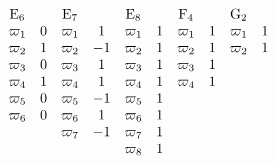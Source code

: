 \[
\begin{array}{c c c c c c c c c c} \mathrm{E} _ {6} & & \mathrm{E} _ {7} & & \mathrm{E} _ {8} & & \mathrm{F} _ {4} & & \mathrm{G} _ {2} \\ \varpi_ {1} & 0 & \varpi_ {1} & 1 & \varpi_ {1} & 1 & \varpi_ {1} & 1 & \varpi_ {1} & 1 \\ \varpi_ {2} & 1 & \varpi_ {2} & - 1 & \varpi_ {2} & 1 & \varpi_ {2} & 1 & \varpi_ {2} & 1 \\ \varpi_ {3} & 0 & \varpi_ {3} & 1 & \varpi_ {3} & 1 & \varpi_ {3} & 1 \\ \varpi_ {4} & 1 & \varpi_ {4} & 1 & \varpi_ {4} & 1 & \varpi_ {4} & 1 \\ \varpi_ {5} & 0 & \varpi_ {5} & - 1 & \varpi_ {5} & 1 \\ \varpi_ {6} & 0 & \varpi_ {6} & 1 & \varpi_ {6} & 1 \\ & & \varpi_ {7} & - 1 & \varpi_ {7} & 1 \\ & & & & \varpi_ {8} & 1 \end{array}
\]
